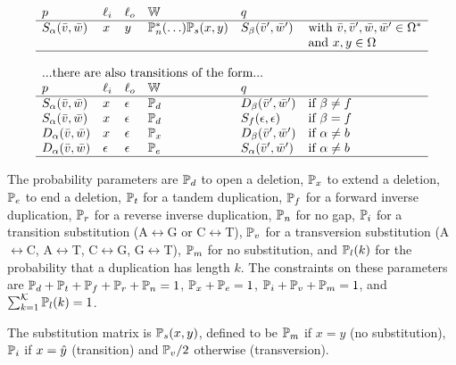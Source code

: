 \documentclass[english]{article}
\begin{document}
\[\begin{array}{llllll}
{  } \\
\src & \inlab & \outlab & \weight & \dest \\
\hline
%
\symstate{\srcblock}(\seqpast,\seqnext) & \sym & \outsym & \pcont(\ldots) \psub & \symstate{\destblock}(\seqpast',\seqnext') & \text{with $\seqpast,\seqpast',\seqnext,\seqnext' \in \kleene{\outalph}$} \\
  & & & & & \text{and $\sym,\outsym \in \outalph$} \\
\hline
%
\\
  \multicolumn{6}{l}{
    \text{...there are also transitions of the form...}
  } \\
\src & \inlab & \outlab & \weight & \dest \\
\hline
\symstate{\srcblock}(\seqpast,\seqnext) & \sym & \emptystring & \pdelopen & \delstate{\destblock}(\seqpast',\seqnext') & \text{if $\destblock \neq f$} \\
\symstate{\srcblock}(\seqpast,\seqnext) & \sym & \emptystring & \pdelopen & \symstate{f}(\emptystring,\emptystring) & \text{if $\destblock = f$} \\
\delstate{\srcblock}(\seqpast,\seqnext) & \sym & \emptystring & \pdelext & \delstate{\destblock}(\seqpast',\seqnext') & \text{if $\srcblock \neq b$} \\
\delstate{\srcblock}(\seqpast,\seqnext) & \emptystring & \emptystring & \pdelend & \symstate{\srcblock}(\seqpast',\seqnext') & \text{if $\srcblock \neq b$} \\
\hline
\end{array}
\]

The probability parameters are
$\mathbb{P}_{d}$ to open a deletion,
$\mathbb{P}_{x}$ to extend a deletion,
$\mathbb{P}_{e}$ to end a deletion,
$\mathbb{P}_{t}$ for a tandem duplication,
$\mathbb{P}_{f}$ for a forward inverse duplication,
$\mathbb{P}_{r}$ for a reverse inverse duplication,
$\mathbb{P}_{n}$ for no gap,
$\mathbb{P}_{i}$ for a transition substitution (A$\leftrightarrow$G or C$\leftrightarrow$T),
$\mathbb{P}_{v}$ for a transversion substitution (A$\leftrightarrow$C, A$\leftrightarrow$T, C$\leftrightarrow$G, G$\leftrightarrow$T),
$\mathbb{P}_{m}$ for no substitution, and
$\mathbb{P}_{l}(k)$ for the probability that a duplication has length $k$.
The constraints on these parameters are
$\mathbb{P}_{d}+\mathbb{P}_{t}+\mathbb{P}_{f}+\mathbb{P}_{r}+\mathbb{P}_{n}=1$,
$\mathbb{P}_{x}+\mathbb{P}_{e}=1$,
$\mathbb{P}_{i}+\mathbb{P}_{v}+\mathbb{P}_{m}=1$,
and
$\sum_{k=1}^{{\cal K}} \mathbb{P}_{l}(k) = 1$.

The substitution matrix is $\mathbb{P}_{s}(x,y)$, defined to be $\mathbb{P}_{m}$ if $x=y$ (no substitution), $\mathbb{P}_{i}$ if $x = \hat{y}$ (transition)
and $\mathbb{P}_{v}/2$ otherwise (transversion).
\end{document}
